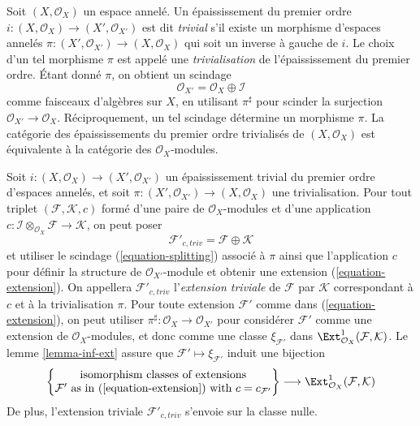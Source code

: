 \begin{remark}
\label{remark-trivial-thickening}
Soit $(X, \mathcal{O}_X)$ un espace annelé. Un épaississement du premier ordre
$i : (X, \mathcal{O}_X) \to (X', \mathcal{O}_{X'})$ est dit
{\it trivial} s'il existe un morphisme d'espaces annelés
$\pi : (X', \mathcal{O}_{X'}) \to (X, \mathcal{O}_X)$ qui soit un
inverse à gauche de $i$. Le choix d'un tel morphisme
$\pi$ est appelé une {\it trivialisation} de l'épaississement du premier ordre.
Étant donné $\pi$, on obtient un scindage
\begin{equation}
\label{equation-splitting}
\mathcal{O}_{X'} = \mathcal{O}_X \oplus \mathcal{I}
\end{equation}
comme faisceaux d'algèbres sur $X$, en utilisant $\pi^\sharp$ pour scinder la surjection
$\mathcal{O}_{X'} \to \mathcal{O}_X$. Réciproquement, un tel scindage détermine
un morphisme $\pi$. La catégorie des épaississements du premier ordre trivialisés de
$(X, \mathcal{O}_X)$ est équivalente à la catégorie des
$\mathcal{O}_X$-modules.
\end{remark}

\begin{remark}
\label{remark-trivial-extension}
Soit $i : (X, \mathcal{O}_X) \to (X', \mathcal{O}_{X'})$
un épaississement trivial du premier ordre d'espaces annelés,
et soit $\pi : (X', \mathcal{O}_{X'}) \to (X, \mathcal{O}_X)$
une trivialisation. Pour tout triplet
$(\mathcal{F}, \mathcal{K}, c)$ formé d'une paire de
$\mathcal{O}_X$-modules et d'une application
$c : \mathcal{I} \otimes_{\mathcal{O}_X} \mathcal{F} \to \mathcal{K}$,
on peut poser
$$
\mathcal{F}'_{c, triv} = \mathcal{F} \oplus \mathcal{K}
$$
et utiliser le scindage (\ref{equation-splitting}) associé à $\pi$
ainsi que l'application $c$ pour définir la structure de $\mathcal{O}_{X'}$-module
et obtenir une extension (\ref{equation-extension}). On appellera
$\mathcal{F}'_{c, triv}$ l'{\it extension triviale} de $\mathcal{F}$
par $\mathcal{K}$ correspondant
à $c$ et à la trivialisation $\pi$. Pour toute extension
$\mathcal{F}'$ comme dans (\ref{equation-extension}), on peut utiliser
$\pi^\sharp : \mathcal{O}_X \to \mathcal{O}_{X'}$ pour considérer $\mathcal{F}'$
comme une extension de $\mathcal{O}_X$-modules, et donc comme une classe $\xi_{\mathcal{F}'}$
dans $\Ext^1_{\mathcal{O}_X}(\mathcal{F}, \mathcal{K})$.
Le lemme \ref{lemma-inf-ext} assure que
$\mathcal{F}' \mapsto \xi_{\mathcal{F}'}$
induit une bijection
$$
\left\{
\begin{matrix}
\text{isomorphism classes of extensions}\\
\mathcal{F}'\text{ as in (\ref{equation-extension}) with }c = c_{\mathcal{F}'}
\end{matrix}
\right\}
\longrightarrow
\Ext^1_{\mathcal{O}_X}(\mathcal{F}, \mathcal{K})
$$
De plus, l'extension triviale $\mathcal{F}'_{c, triv}$ s'envoie sur la classe nulle.
\end{remark}


